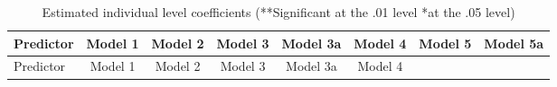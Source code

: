 \documentclass[12pt,twoside]{reedthesis}
\begin{document}
  \begin{longtable}[]{@{}lccccccc@{}}
  \caption{Estimated individual level coefficients (**Significant at the
  .01 level *at the .05 level)
  \label{tab:model_indiv_coef}}\tabularnewline
  \toprule
  \begin{minipage}[b]{0.12\columnwidth}\raggedright\strut
  Predictor\strut
  \end{minipage} & \begin{minipage}[b]{0.09\columnwidth}\centering\strut
  Model 1\strut
  \end{minipage} & \begin{minipage}[b]{0.10\columnwidth}\centering\strut
  Model 2\strut
  \end{minipage} & \begin{minipage}[b]{0.10\columnwidth}\centering\strut
  Model 3\strut
  \end{minipage} & \begin{minipage}[b]{0.10\columnwidth}\centering\strut
  Model 3a\strut
  \end{minipage} & \begin{minipage}[b]{0.10\columnwidth}\centering\strut
  Model 4\strut
  \end{minipage} & \begin{minipage}[b]{0.10\columnwidth}\centering\strut
  Model 5\strut
  \end{minipage} & \begin{minipage}[b]{0.10\columnwidth}\centering\strut
  Model 5a\strut
  \end{minipage}\tabularnewline
  \midrule
  \endfirsthead
  \toprule
  \begin{minipage}[b]{0.12\columnwidth}\raggedright\strut
  Predictor\strut
  \end{minipage} & \begin{minipage}[b]{0.09\columnwidth}\centering\strut
  Model 1\strut
  \end{minipage} & \begin{minipage}[b]{0.10\columnwidth}\centering\strut
  Model 2\strut
  \end{minipage} & \begin{minipage}[b]{0.10\columnwidth}\centering\strut
  Model 3\strut
  \end{minipage} & \begin{minipage}[b]{0.10\columnwidth}\centering\strut
  Model 3a\strut
  \end{minipage} & \begin{minipage}[b]{0.10\columnwidth}\centering\strut
  Model 4\strut

\end{minipage}
\end{longtable}
\end{document}
